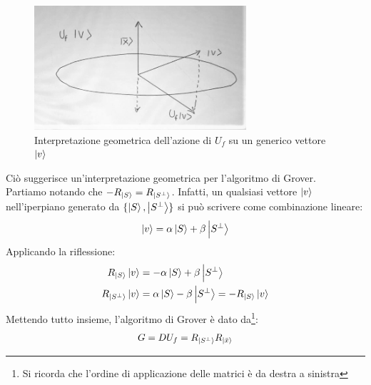 \documentclass[../../InformazioneQuantistica.tex]{subfiles}
\begin{document}
\begin{figure}[H]
\centering
\includegraphics[width=0.7\textwidth]{Immagini/18_4/riflessione.jpg}
\caption{Interpretazione geometrica dell'azione di $U_f$ su un generico vettore $\Ket{v}$\label{fig:azione-Uf}}
\end{figure}

Ciò suggerisce un'interpretazione geometrica per l'algoritmo di Grover.\\
Partiamo notando che $-R_{\Ket{S}} = R_{\Ket{S^\perp}}$. Infatti, un qualsiasi vettore $\Ket{v}$ nell'iperpiano generato da $\{\Ket{S}, \Ket{S^\perp}\}$ si può scrivere come combinazione lineare:
\begin{align*}
    \Ket{v} = \alpha \Ket{S} + \beta \Ket{S^\perp}
\end{align*}
Applicando la riflessione:
\begin{align*}
R_{\Ket{S}}\Ket{v} &= -\alpha \Ket{S} + \beta \Ket{S^\perp}\\
    R_{\Ket{S^\perp}} \Ket{v} &= \alpha \Ket{S} - \beta \Ket{S^\perp} = -R_{\Ket{S}}\Ket{v}\\
\end{align*}
Mettendo tutto insieme, l'algoritmo di Grover è dato da\footnote{Si ricorda che l'ordine di applicazione delle matrici è da destra a sinistra}:
\begin{align*}
    G = D U_f = R_{\Ket{S^\perp}} R_{\Ket{\bar{x}}}
\end{align*}
\end{document}

